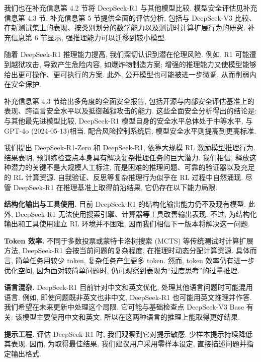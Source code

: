 我们也在补充信息第 4.2 节将 DeepSeek-R1 与其他模型比较. 模型安全评估见补充信息第 4.3 节. 补充信息第 5 节提供全面的评估分析, 包括与 DeepSeek-V3 比较、在新测试集上的表现、按类别划分的数学能力以及测试时计算扩展行为的研究. 补充信息第 6 节显示, 强推理能力可以迁移到较小模型.

\label{r1n-ethics-safety}
随着 DeepSeek-R1 推理能力提高, 我们深切认识到潜在伦理风险. 例如, R1 可能遭到越狱攻击, 导致产生危险内容, 如爆炸物制造方案; 增强的推理能力又使模型能够给出更可操作、更可执行的方案. 此外, 公开模型也可能被进一步微调, 从而削弱内在安全保护.

补充信息第 4.3 节给出多角度的全面安全报告, 包括开源与内部安全评估基准上的表现、跨语言安全水平以及抵御越狱攻击的能力. 这些全面安全分析得出的结论是: 与其他最先进模型比较, DeepSeek-R1 模型自身的安全水平总体处于中等水平, 与 GPT-4o (2024-05-13)\cite{r1n-ref30}相当. 配合风险控制系统后, 模型安全水平则提高到更高标准.

\label{r1n-conclusion}
我们提出 DeepSeek-R1-Zero 和 DeepSeek-R1, 依靠大规模 RL 激励模型推理行为. 结果表明, 预训练检查点本身具有解决复杂推理任务的巨大潜力. 我们相信, 释放这种潜力的关键不是大规模人工标注, 而是困难的推理问题、可靠的验证器以及充足的 RL 计算资源. 自我验证、反思等复杂推理行为似乎在 RL 过程中自然涌现. 尽管 DeepSeek-R1 在推理基准上取得前沿结果, 它仍存在以下能力局限.

\noindent\textbf{结构化输出与工具使用.} 目前 DeepSeek-R1 的结构化输出能力仍不及现有模型. 此外, DeepSeek-R1 无法使用搜索引擎、计算器等工具改善输出表现. 不过, 为结构化输出和工具使用建立 RL 环境并不困难, 因而我们相信下一版本将解决这一问题.

\noindent\textbf{Token 效率.} 不同于多数投票或蒙特卡洛树搜索 (MCTS) 等传统测试时计算扩展方法, DeepSeek-R1 会按当前问题的复杂程度, 在推理时动态分配计算资源. 具体而言, 简单任务用较少 token, 复杂任务产生更多 token. 然而, token 效率仍有进一步优化空间, 因为面对较简单问题时, 仍可观察到表现为“过度思考”的过量推理.

\noindent\textbf{语言混杂.} DeepSeek-R1 目前针对中文和英文优化, 处理其他语言问题时可能混用语言. 例如, 即使问题既非英文也非中文, DeepSeek-R1 也可能用英文推理并作答. 我们希望在未来更新中处理这个局限. 它可能与基础检查点 DeepSeek-V3 Base 有关: 该模型主要使用中文和英文, 所以在这两种语言的推理上能取得更好结果.

\noindent\textbf{提示工程.} 评估 DeepSeek-R1 时, 我们观察到它对提示敏感. 少样本提示持续降低其表现. 因而, 为取得最佳结果, 我们建议用户采用零样本设定, 直接描述问题并指定输出格式.

